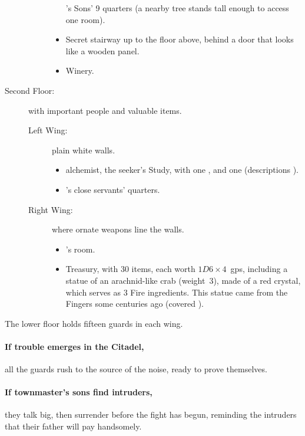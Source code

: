 \begin{multicols}{2}
\begin{description}
\begin{description}
\begin{itemize}
        's Sons' 9 quarters (a nearby tree stands tall enough to access one room).
        \item
        Secret stairway up to the floor above, behind a door that looks like a wooden panel.
        \item
        Winery.
      \end{itemize}
    \end{description}
  \item[Second Floor:]
  with important people and valuable items.
    \begin{description}
      \item[Left Wing:]
      plain white walls.
      \begin{itemize}
        \item
        \gls{alchemist}, the \gls{seeker}'s Study, with one \lootTalisman, and one \lootTalisman (descriptions ).
        \item
        's close servants' quarters.
      \end{itemize}
      \item[Right Wing:]
      where ornate weapons line the walls.
      \begin{itemize}
        \item
        's room.
        \item
        Treasury, with 30 items, each worth $1D6\times 4$~\glspl{gp}, including a statue of an arachnid-like crab (\gls{weight}~3), made of a red crystal, which serves as 3 Fire \glspl{ingredient}.
        This statue came from the Fingers some centuries ago (covered ).
      \end{itemize}
    \end{description}
\end{description}

The lower floor holds fifteen guards in each wing.


\paragraph{If trouble emerges in the Citadel,}
all the guards rush to the source of the noise, ready to prove themselves.


\paragraph{If \gls{townmaster}'s sons find intruders,}
they talk big, then surrender before the fight has begun, reminding the intruders that their father will pay handsomely.


\end{multicols}
